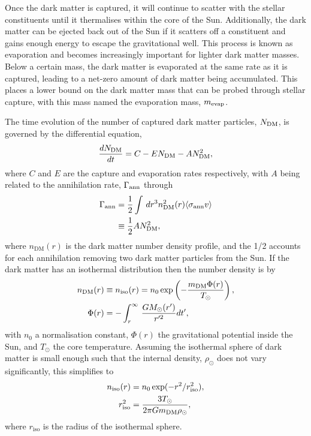 Once the dark matter is captured, it will continue to scatter with the stellar constituents until it thermalises within the core of the Sun. Additionally, the dark matter can be ejected back out of the Sun if it scatters off a constituent and gains enough energy to escape the gravitational well. This process is known as evaporation and becomes increasingly important for lighter dark matter masses. Below a certain mass, the dark matter is evaporated at the same rate as it is captured, leading to a net-zero amount of dark matter being accumulated. This places a lower bound on the dark matter mass that can be probed through stellar capture, with this mass named the evaporation mass, $m_\mathrm{evap}$.

The time evolution of the number of captured dark matter particles, $N_\mathrm{DM}$, is governed by the differential equation, 
\begin{equation}
    \frac{d N_\mathrm{DM}}{dt} = C  - E N_\mathrm{DM}- A N_\mathrm{DM}^2,
    \label{eq:DM_num_Sun}
\end{equation}
where $C$ and $E$ are the capture and evaporation rates respectively, with $A$ being related to the annihilation rate, $\Gamma_\mathrm{ann}$ through
\begin{align}
    \Gamma_\mathrm{ann} & = \frac{1}{2}\int\,dr^3 n_\mathrm{DM}^2(r) \langle \sigma_{\rm ann} v \rangle\\
    & \equiv \frac{1}{2}A N_\mathrm{DM}^2,
\end{align}
where $n_\mathrm{DM}(r)$ is the dark matter number density profile, and the 1/2 accounts for each annihilation removing two dark matter particles from the Sun. If the dark matter has an isothermal distribution then the number density is by
\begin{align}
    n_\mathrm{DM}(r) & \equiv n_\mathrm{iso}(r) = n_0\exp\left( - \frac{m_\mathrm{DM} \Phi(r)}{T_\odot}\right),\\
    \Phi(r) & = -\int_r^\infty \,\frac{G M_\odot(r')}{r'^2}dt',
\end{align}
with $n_0$ a normalisation constant, $\Phi(r)$ the gravitational potential inside the Sun, and $T_\odot$ the core temperature. Assuming the isothermal sphere of dark matter is small enough such that the internal density, $\rho_\odot$ does not vary significantly, this simplifies to
\begin{align}
    n_\mathrm{iso}(r) & = n_0 \exp(-r^2/r_\mathrm{iso}^2),\\
    r_\mathrm{iso}^2 & = \frac{3 T_\odot}{2\pi G m_\mathrm{DM} \rho_\odot},
\end{align}
where $r_\mathrm{iso}$ is the radius of the isothermal sphere.

